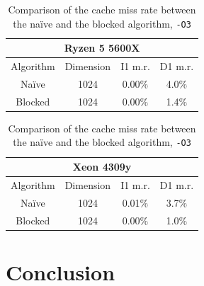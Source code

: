 \documentclass{article}
\begin{document}
\begin{table}[h]
    \centering
    \begin{tabular}{|c|c|c|c|}
        \hline
        \multicolumn{4}{|c|}{\textbf{Ryzen 5 5600X}} \\ 
        \hline
        Algorithm & Dimension & I1 m.r. & D1 m.r. \\ \hline
        Na\"{i}ve & 1024        & 0.00\%       & 4.0\%        \\ \hline
        Blocked  & 1024        & 0.00\%       & 1.4\%        \\ \hline
    \end{tabular}
    \hspace{2em}
    \begin{tabular}{|c|c|c|c|}
        \hline
        \multicolumn{4}{|c|}{\textbf{Xeon 4309y}} \\ 
        \hline
        Algorithm & Dimension & I1 m.r. & D1 m.r. \\ \hline
        Na\"{i}ve & 1024        & 0.01\%       & 3.7\%        \\ \hline
        Blocked  & 1024        & 0.00\%       & 1.0\%        \\ \hline
    \end{tabular}
    \caption{Comparison of the cache miss rate between the na\"{i}ve and the blocked algorithm, \texttt{-O3}}
    \label{tab:blocked_cache_miss}
\end{table}

\section{Conclusion}
\end{document}
